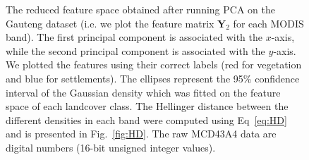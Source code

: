 \documentclass{article}
\begin{document}
\begin{figure}[h!]
%
\caption{The reduced feature space obtained after running PCA on the Gauteng dataset (i.e. we plot the feature matrix $\mathbf{Y}_2$ for each MODIS band). The first
principal component is associated with the $x$-axis, while the second principal component is associated with the $y$-axis. We plotted the features using their correct labels (red for vegetation 
and blue for settlements). The ellipses represent the 95\% confidence interval of the Gaussian density which was fitted on the feature space of each landcover class. The Hellinger 
distance between the different densities in each band were computed using Eq~\ref{eq:HD} and is presented in Fig.~\ref{fig:HD}. The raw MCD43A4 data are
digital numbers (16-bit unsigned integer values).}
\label{fig:density_PCA}
%
\end{figure}

\vfill
\pagebreak
\end{document}
